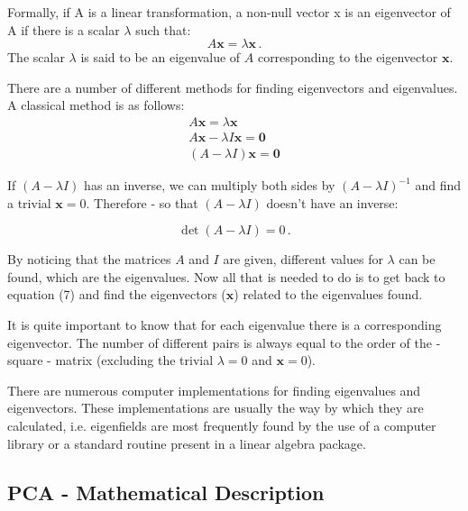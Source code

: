 \documentclass[12pt]{article}
\begin{document}
Formally, if A is a linear transformation, a non-null vector x is 
an eigenvector of A if there is a scalar $\lambda$ such that:
\begin{equation}
    A\mathbf{x} = \lambda \mathbf{x} \, .
\end{equation}
The scalar $\lambda$ is said to be an eigenvalue of $A$ corresponding to the eigenvector $\mathbf{x}$.

There are a number of different methods for finding eigenvectors and eigenvalues. A
classical method is as follows:
\[
  \begin{array}{c}
    A\mathbf{x} = \lambda \mathbf{x} \\

    A \mathbf{x} - \lambda I \mathbf{x} = \mathbf{0} \\
   
    (A - \lambda I) \mathbf{x} = \mathbf{0} 

  \end{array}
\]

If $(A-\lambda I)$ has an inverse, we can multiply both sides by $(A-\lambda I)^{-1}$
and find a trivial $\mathbf{x}=0$.
Therefore - so that $(A-\lambda I)$ doesn't have an inverse:

\begin{equation}
    \det(A - \lambda I) = 0\, . 
\end{equation}

By noticing that the matrices $A$ and $I$ are given, different values for $\lambda$ can be found, which are
the eigenvalues.
Now all that is needed to do is to get back to equation (7) and find the eigenvectors ($\mathbf{x}$)
related to the eigenvalues found.

It is quite important to know that for each eigenvalue there is a corresponding
eigenvector. The number of different pairs is always equal to the order of the - square - matrix
(excluding the trivial $\lambda=0$ and $\mathbf{x}=0$).

There are numerous computer implementations for finding eigenvalues and eigenvectors. These
implementations are usually the way by which they are calculated, i.e. eigenfields are
most frequently found by the use of a computer library or a standard routine present in
a linear algebra package.

\subsection{PCA - Mathematical Description}
\end{document}
